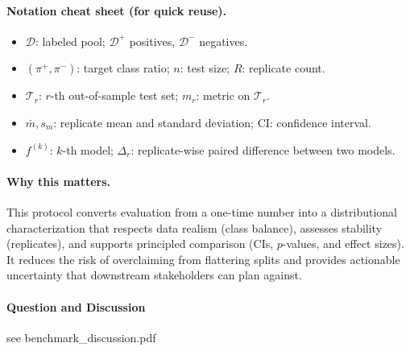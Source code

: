 \documentclass[11pt]{article}
\begin{document}
\paragraph{Notation cheat sheet (for quick reuse).}
\begin{itemize}
  \item $\mathcal{D}$: labeled pool; $\mathcal{D}^{+}$ positives, $\mathcal{D}^{-}$ negatives.
  \item $(\pi^{+},\pi^{-})$: target class ratio; $n$: test size; $R$: replicate count.
  \item $\mathcal{T}_r$: $r$-th out-of-sample test set; $m_r$: metric on $\mathcal{T}_r$.
  \item $\bar{m}, s_m$: replicate mean and standard deviation; $\text{CI}$: confidence interval.
  \item $f^{(k)}$: $k$-th model; $\Delta_r$: replicate-wise paired difference between two models.
\end{itemize}

\paragraph{Why this matters.}
This protocol converts evaluation from a one-time number into a distributional characterization that respects data realism (class balance), assesses stability (replicates), and supports principled comparison (CIs, $p$-values, and effect sizes). It reduces the risk of overclaiming from flattering splits and provides actionable uncertainty that downstream stakeholders can plan against.

\paragraph{Question and Discussion}
see benchmark\_discussion.pdf
\end{document}
